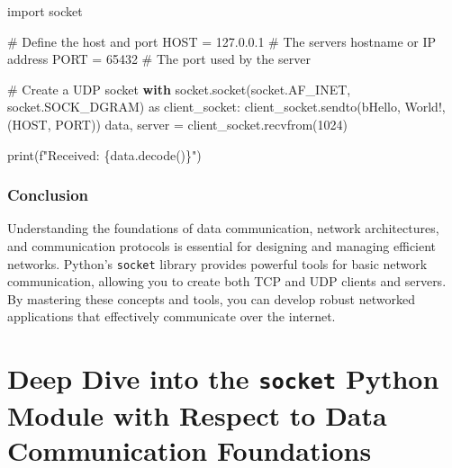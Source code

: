 \documentclass[
  letterpaper,
  DIV=11,
  numbers=noendperiod]{scrreprt}
\newenvironment{Shaded}{\begin{snugshade}}{\end{snugshade}}
\newcommand{\BuiltInTok}[1]{\textcolor[rgb]{0.00,0.23,0.31}{#1}}
\newcommand{\CommentTok}[1]{\textcolor[rgb]{0.37,0.37,0.37}{#1}}
\newcommand{\ControlFlowTok}[1]{\textcolor[rgb]{0.00,0.23,0.31}{\textbf{#1}}}
\newcommand{\DecValTok}[1]{\textcolor[rgb]{0.68,0.00,0.00}{#1}}
\newcommand{\ImportTok}[1]{\textcolor[rgb]{0.00,0.46,0.62}{#1}}
\newcommand{\NormalTok}[1]{\textcolor[rgb]{0.00,0.23,0.31}{#1}}
\newcommand{\OperatorTok}[1]{\textcolor[rgb]{0.37,0.37,0.37}{#1}}
\newcommand{\SpecialCharTok}[1]{\textcolor[rgb]{0.37,0.37,0.37}{#1}}
\newcommand{\SpecialStringTok}[1]{\textcolor[rgb]{0.13,0.47,0.30}{#1}}
\newcommand{\StringTok}[1]{\textcolor[rgb]{0.13,0.47,0.30}{#1}}
\begin{document}
\begin{Shaded}
\begin{Highlighting}[]
\ImportTok{import}\NormalTok{ socket}

\CommentTok{\# Define the host and port}
\NormalTok{HOST }\OperatorTok{=} \StringTok{\textquotesingle{}127.0.0.1\textquotesingle{}}  \CommentTok{\# The server\textquotesingle{}s hostname or IP address}
\NormalTok{PORT }\OperatorTok{=} \DecValTok{65432}        \CommentTok{\# The port used by the server}

\CommentTok{\# Create a UDP socket}
\ControlFlowTok{with}\NormalTok{ socket.socket(socket.AF\_INET, socket.SOCK\_DGRAM) }\ImportTok{as}\NormalTok{ client\_socket:}
\NormalTok{    client\_socket.sendto(}\StringTok{b\textquotesingle{}Hello, World!\textquotesingle{}}\NormalTok{, (HOST, PORT))}
\NormalTok{    data, server }\OperatorTok{=}\NormalTok{ client\_socket.recvfrom(}\DecValTok{1024}\NormalTok{)}

\BuiltInTok{print}\NormalTok{(}\SpecialStringTok{f"Received: }\SpecialCharTok{\{}\NormalTok{data}\SpecialCharTok{.}\NormalTok{decode()}\SpecialCharTok{\}}\SpecialStringTok{"}\NormalTok{)}
\end{Highlighting}
\end{Shaded}

\subsection{Conclusion}\label{conclusion-30}

Understanding the foundations of data communication, network
architectures, and communication protocols is essential for designing
and managing efficient networks. Python's \texttt{socket} library
provides powerful tools for basic network communication, allowing you to
create both TCP and UDP clients and servers. By mastering these concepts
and tools, you can develop robust networked applications that
effectively communicate over the internet.


\chapter{\texorpdfstring{Deep Dive into the \texttt{socket} Python
Module with Respect to Data Communication
Foundations}{Deep Dive into the socket Python Module with Respect to Data Communication Foundations}}\label{deep-dive-into-the-socket-python-module-with-respect-to-data-communication-foundations}
\end{document}
